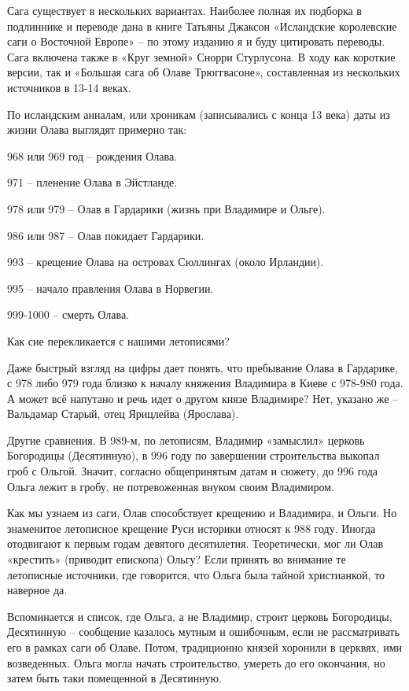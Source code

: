 Сага существует в нескольких вариантах. Наиболее полная их подборка в подлиннике и переводе дана в книге Татьяны Джаксон «Исландские королевские саги о Восточной Европе»\cite{jackson01} – по этому изданию я и буду цитировать переводы. Сага включена также в «Круг земной» Снорри Стурлусона. В ходу как короткие версии, так и «Большая сага об Олаве Трюггвасоне», составленная из нескольких источников в 13-14 веках.

По исландским анналам, или хроникам (записывались с конца 13 века) даты из жизни Олава выглядят примерно так:

968 или 969 год – рождения Олава.

971 – пленение Олава в Эйстланде.

978 или 979 – Олав в Гардарики (жизнь при Владимире и Ольге).

986 или 987 – Олав покидает Гардарики.

993 – крещение Олава на островах Сюллингах (около Ирландии).

995 – начало правления Олава в Норвегии.

999-1000 – смерть Олава.

Как сие перекликается с нашими летописями?

Даже быстрый взгляд на цифры дает понять, что пребывание Олава в Гардарике, с 978 либо 979 года близко к началу княжения Владимира в Киеве с 978-980 года. А может всё напутано и речь идет о другом князе Владимире? Нет, указано же – Вальдамар Старый, отец Ярицлейва (Ярослава).

Другие сравнения. В 989-м, по летописям, Владимир «замыслил» церковь Богородицы (Десятинную), в 996 году по завершении строительства выкопал гроб с Ольгой. Значит, согласно общепринятым датам и сюжету, до 996 года Ольга лежит в гробу, не потревоженная внуком своим Владимиром.

Как мы узнаем из саги, Олав способствует крещению и Владимира, и Ольги. Но знаменитое летописное крещение Руси историки относят к 988 году. Иногда отодвигают к первым годам девятого десятилетия. Теоретически, мог ли Олав «крестить» (приводит епископа) Ольгу? Если принять во внимание те летописные источники, где говорится, что Ольга была тайной христианкой, то наверное да.

Вспоминается и список, где Ольга, а не Владимир, строит церковь Богородицы, Десятинную – сообщение казалось мутным и ошибочным, если не рассматривать его в рамках саги об Олаве. Потом, традиционно князей хоронили в церквях, ими возведенных. Ольга могла начать строительство, умереть до его окончания, но затем быть таки помещенной в Десятинную.

